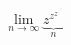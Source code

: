 \documentclass{article}
\begin{document}





$$\lim_{n \to \infty} \underbrace{z^{z^{z^{.^{ .^{.^z} }}}}}_n$$
\end{document}
